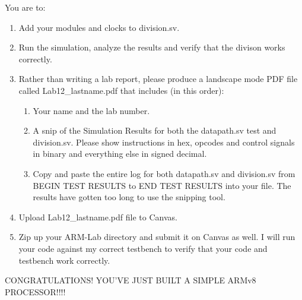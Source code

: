 You are to:
\begin{enumerate}
	\item Add your modules and clocks to division.sv.
	\item Run the simulation, analyze the results and verify that the divison works correctly.
	\item Rather than writing a lab report, please produce a landscape mode PDF file called Lab12\_lastname.pdf that includes (in this order):
	\begin{enumerate}
		\item Your name and the lab number.
		\item A snip of the Simulation Results for both the datapath.sv test and division.sv.  Please show instructions in hex, opcodes and control signals in binary and everything else in signed decimal.  
		\item Copy and paste the entire log for both datapath.sv and division.sv from BEGIN TEST RESULTS to END TEST RESULTS into your file.  The results have gotten too long to use the snipping tool.	
	\end{enumerate}
\item Upload Lab12\_lastname.pdf file to Canvas.
\item Zip up your ARM-Lab directory and submit it on Canvas as well.  I will run your code against my correct testbench to verify that your code and testbench work correctly.
\end{enumerate} 

CONGRATULATIONS!  YOU'VE JUST BUILT A SIMPLE ARMv8 PROCESSOR!!!!